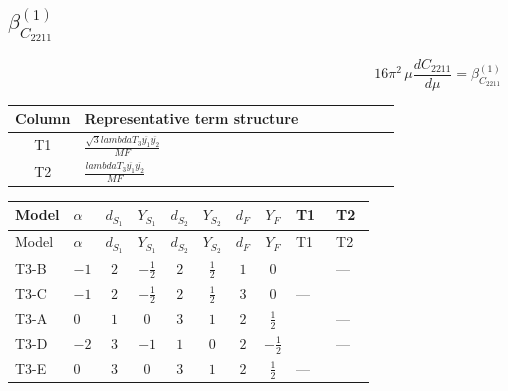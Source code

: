 \documentclass[8pt]{article}
\begin{document}
\begin{landscape}
\section*{$\beta_{C_{2211}}^{(1)}$}
\[16\pi^2\,\mu\frac{d C_{2211}}{d\mu}=\beta_{C_{2211}}^{(1)}\]
\begin{center}
\begin{tabular}{@{}c >{\raggedright\arraybackslash}p{0.82\linewidth}@{}}
\toprule
Column & Representative term structure \\
\midrule
T1 & \(\displaystyle \frac{\sqrt{3} lambdaT_{3} \overline{y_{1}} \overline{y_{2}}}{MF}\) \\
\midrule
T2 & \(\displaystyle \frac{lambdaT_{3} \overline{y_{1}} \overline{y_{2}}}{MF}\) \\
\midrule
\bottomrule
\end{tabular}
\end{center}
\smallskip
\tiny
\begin{longtable}{@{}llcccccc >{\raggedright\arraybackslash}p{0.21\linewidth} >{\raggedright\arraybackslash}p{0.21\linewidth}@{}}
\toprule
Model & $\alpha$ & $d_{S_1}$ & $Y_{S_1}$ & $d_{S_2}$ & $Y_{S_2}$ & $d_F$ & $Y_F$ & T1 & T2 \\
\midrule
\endfirsthead
\toprule
Model & $\alpha$ & $d_{S_1}$ & $Y_{S_1}$ & $d_{S_2}$ & $Y_{S_2}$ & $d_F$ & $Y_F$ & T1 & T2 \\
\midrule
\endhead
T3-B & $-1$ & $2$ & $-\frac{1}{2}$ & $2$ & $\frac{1}{2}$ & $1$ & $0$ & \scriptsize\adjustbox{max width=\linewidth}{$\begin{gathered} \frac{2 \sqrt{3} lambdaT_{3} \overline{y_{1}} \overline{y_{2}}}{3 MF}\end{gathered}$} & --- \\
\midrule
T3-C & $-1$ & $2$ & $-\frac{1}{2}$ & $2$ & $\frac{1}{2}$ & $3$ & $0$ & --- & \scriptsize\adjustbox{max width=\linewidth}{$\begin{gathered} - \frac{4 lambdaT_{3} \overline{y_{1}} \overline{y_{2}}}{3 MF}\end{gathered}$} \\
\midrule
T3-A & $0$ & $1$ & $0$ & $3$ & $1$ & $2$ & $\frac{1}{2}$ & \scriptsize\adjustbox{max width=\linewidth}{$\begin{gathered} \frac{2 \sqrt{3} lambdaT_{3} \overline{y_{1}} \overline{y_{2}}}{3 MF}\end{gathered}$} & --- \\
\midrule
T3-D & $-2$ & $3$ & $-1$ & $1$ & $0$ & $2$ & $-\frac{1}{2}$ & \scriptsize\adjustbox{max width=\linewidth}{$\begin{gathered} \frac{2 \sqrt{3} lambdaT_{3} \overline{y_{1}} \overline{y_{2}}}{3 MF}\end{gathered}$} & --- \\
\midrule
T3-E & $0$ & $3$ & $0$ & $3$ & $1$ & $2$ & $\frac{1}{2}$ & --- & \scriptsize\adjustbox{max width=\linewidth}{$\begin{gathered} - \frac{2 lambdaT_{3} \overline{y_{1}} \overline{y_{2}}}{MF}\end{gathered}$} \\
\midrule
\bottomrule
\end{longtable}
\clearpage

\end{landscape}
\end{document}
